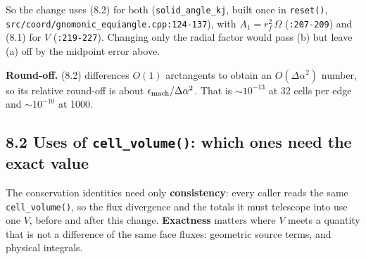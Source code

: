 \documentclass[11pt,a4paper]{article}
\begin{document}
So the change uses (8.2) for both (\texttt{solid\_angle\_kj}, built once in \texttt{reset()},
\texttt{src/coord/gnomonic\_equiangle.cpp:124-137}), with $A_1=r_f^2\,\Omega$ (\texttt{:207-209}) and (8.1)
for $V$ (\texttt{:219-227}). Changing only the radial factor would pass (b) but leave (a) off by the
midpoint error above.

\textbf{Round-off.} (8.2) differences $O(1)$ arctangents to obtain an $O(\Delta\alpha^2)$ number, so its
relative round-off is about $\epsilon_{\rm mach}/\Delta\alpha^2$. That is $\sim 10^{-13}$ at 32 cells
per edge and $\sim 10^{-10}$ at 1000.

\subsection*{8.2 Uses of \texttt{cell\_volume()}: which ones need the exact value}

The conservation identities need only \textbf{consistency}: every caller reads the same
\texttt{cell\_volume()}, so the flux divergence and the totals it must telescope into use one $V$, before
and after this change. \textbf{Exactness} matters where $V$ meets a quantity that is not a difference
of the same face fluxes: geometric source terms, and physical integrals.
\end{document}
